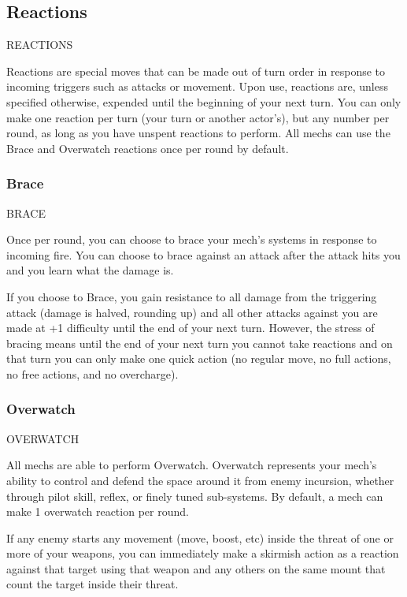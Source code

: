 \subsection{Reactions}
                                        REACTIONS

Reactions are special moves that can be made out of turn order in response to incoming triggers
such as attacks or movement. Upon use, reactions are, unless specified otherwise, expended
until the beginning of your next turn. You can only make one reaction per turn (your turn or
another actor’s), but any number per round, as long as you have unspent reactions to perform.
All mechs can use the Brace and Overwatch reactions once per round by default.

\subsubsection{Brace}
                                                  BRACE

Once per round, you can choose to brace your mech’s systems in response to incoming fire. You
can choose to brace against an attack after the attack hits you and you learn what the damage
is.


If you choose to Brace, you gain resistance to all damage from the triggering attack (damage is
halved, rounding up) and all other attacks against you are made at +1 difficulty until the end of
your next turn. However, the stress of bracing means until the end of your next turn you cannot
take reactions and on that turn you can only make one quick action (no regular move, no full
actions, no free actions, and no overcharge).

\subsubsection{Overwatch}

                                              OVERWATCH

All mechs are able to perform Overwatch. Overwatch represents your mech’s ability to control
and defend the space around it from enemy incursion, whether through pilot skill, reflex, or finely
tuned sub-systems. By default, a mech can make 1 overwatch reaction per round.


If any enemy starts any movement (move, boost, etc) inside the threat of one or more of your
weapons, you can immediately make a skirmish action as a reaction against that target using
that weapon and any others on the same mount that count the target inside their threat.


